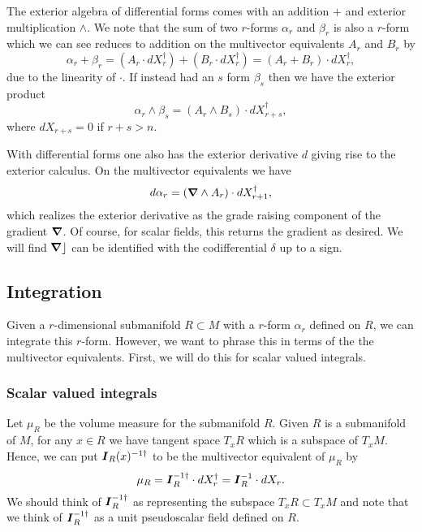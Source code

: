 The exterior algebra of differential forms comes with an addition $+$ and exterior multiplication $\wedge$.  We note that the sum of two $r$-forms $\alpha_r$ and $\beta_r$ is also a $r$-form which we can see reduces to addition on the multivector equivalents $A_r$ and $B_r$ by
\begin{equation}
\alpha_r + \beta_r = (A_r \cdot dX_r^\dagger)+(B_r \cdot dX_r^\dagger) = (A_r + B_r) \cdot dX_r^\dagger,
\end{equation}
due to the linearity of $\cdot$.  If instead had an $s$ form $\beta_s$ then we have the exterior product
\begin{equation}
\alpha_r \wedge \beta_s = (A_r \wedge B_s) \cdot dX_{r+s}^\dagger,
\end{equation}
where $dX_{r+s}=0$ if $r+s>n$.  

With differential forms one also has the exterior derivative $d$ giving rise to the exterior calculus. On the multivector equivalents we have
\begin{equation}
d \alpha_r = (\boldsymbol{\nabla} \wedge A_r) \cdot dX_{r+1}^\dagger,
\end{equation}
which realizes the exterior derivative as the grade raising component of the gradient $\boldsymbol{\nabla}$. Of course, for scalar fields, this returns the gradient as desired. We will find $\boldsymbol{\nabla} \rfloor$ can be identified with the codifferential $\delta$ up to a sign. 

\subsection{Integration}
\label{subsec:integration_on_submanifolds}

Given a $r$-dimensional submanifold $R \subset M$ with a $r$-form $\alpha_r$ defined on $R$, we can integrate this $r$-form. However, we want to phrase this in terms of the the multivector equivalents.  First, we will do this for scalar valued integrals. 

\subsubsection{Scalar valued integrals}
Let $\mu_R$ be the volume measure for the submanifold $R$.  Given $R$ is a submanifold of $M$, for any $x \in R$ we have tangent space $T_x R$ which is a subspace of $T_x M$. Hence, we can put $\boldsymbol{I}_R(x)^{-1 \dagger}$ to be the multivector equivalent of $\mu_R$ by
\begin{equation}
\mu_R = \boldsymbol{I}_R^{-1 \dagger} \cdot dX_r^\dagger = \boldsymbol{I}_R^{-1} \cdot dX_r.
\end{equation}
We should think of $\boldsymbol{I}_R^{-1 \dagger}$ as representing the subspace $T_x R \subset T_x M$ and note that we think of $\boldsymbol{I}_R^{-1 \dagger}$ as a unit pseudoscalar field defined on $R$. 


